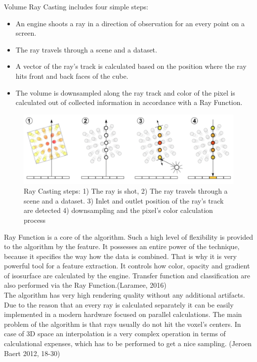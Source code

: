 \documentclass[twoside, english, 11pt]{report}
\begin{document}
Volume Ray Casting includes four simple steps:
\begin{itemize} \item An engine shoots a ray in a direction of observation for an every point on a screen.
\item The ray travels through a scene and a dataset.
\item A vector of the ray's track is calculated based on the position where the ray hits front and back faces of the cube.
\item The volume is downsampled along the ray track and color of the pixel is calculated out of collected information in accordance with a Ray Function.
\end{itemize}
\begin{figure}[!h]
\centerline{\includegraphics[scale=0.35]{img/rayCast}}
\caption{Ray Casting steps: 1) The ray is shot, 2) The ray travels through a scene and a dataset. 3) Inlet and outlet position of the ray's track are detected 4) downsampling and the pixel's color calculation process}
\end{figure}

Ray Function is a core of the algorithm. Such a high level of flexibility is provided to the algorithm by the feature. It possesses an entire power of the technique, because it specifies the way how the data is combined. That is why it is very powerful tool for a feature extraction. It controls how color, opacity and gradient of isosurface are calculated by the engine. Transfer function and classification are also performed via the Ray Function.(Laramee, 2016)\\

The algorithm has very high rendering quality without any additional artifacts. Due to the reason that an every ray is calculated separately it can be easily implemented in a modern hardware focused on parallel calculations. The main problem of the algorithm is that rays usually do not hit the voxel's centers. In case of 3D space an interpolation is a very complex operation in terms of calculational expenses, which has to be performed to get a nice sampling. (Jeroen Baert 2012, 18-30)
\end{document}
